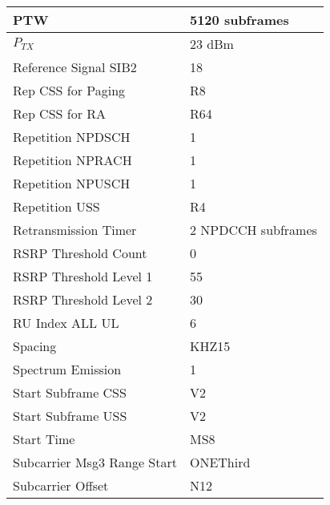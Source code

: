 \begin{longtable}{|p{8cm}|p{5cm}|}
PTW                              						& 5120 subframes     \\ \hline
$P_{TX}$                                                & 23 dBm             \\ \hline
Reference Signal SIB2                                   & 18                 \\ \hline
Rep CSS for Paging                                      & R8                 \\ \hline
Rep CSS for RA                                          & R64                \\ \hline
Repetition NPDSCH                                       & 1                  \\ \hline
Repetition NPRACH                                       & 1                  \\ \hline
Repetition NPUSCH                                       & 1                  \\ \hline
Repetition USS                                          & R4                 \\ \hline
Retransmission Timer                                    & 2 NPDCCH subframes \\ \hline
RSRP Threshold Count                                    & 0                  \\ \hline
RSRP Threshold Level 1                                  & 55                 \\ \hline
RSRP Threshold Level 2                                  & 30                 \\ \hline
RU Index ALL UL                                         & 6                  \\ \hline
Spacing                                                 & KHZ15              \\ \hline
Spectrum Emission                                       & 1                  \\ \hline
Start Subframe CSS                                      & V2                 \\ \hline
Start Subframe USS                                      & V2                 \\ \hline
Start Time                                              & MS8                \\ \hline
Subcarrier Msg3 Range Start                             & ONEThird           \\ \hline
Subcarrier Offset                                       & N12                \\ \hline

\end{longtable}

